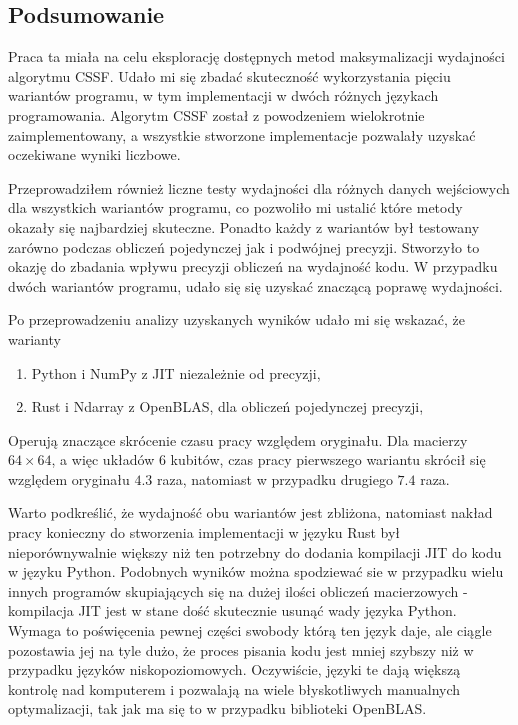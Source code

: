 \documentclass[11pt, a4paper]{article}
\begin{document}
\begin{sloppypar}
    \subsection{Podsumowanie}
    Praca ta miała na celu eksplorację dostępnych metod maksymalizacji wydajności algorytmu
    CSSF. Udało mi się zbadać skuteczność wykorzystania pięciu wariantów programu, w tym
    implementacji w dwóch różnych językach programowania. Algorytm CSSF został z
    powodzeniem wielokrotnie zaimplementowany, a wszystkie stworzone implementacje pozwalały
    uzyskać oczekiwane wyniki liczbowe.

    Przeprowadziłem również liczne testy wydajności dla różnych danych wejściowych dla wszystkich
    wariantów programu, co pozwoliło mi ustalić które metody okazały się najbardziej
    skuteczne. Ponadto każdy z wariantów był testowany zarówno podczas obliczeń pojedynczej
    jak i podwójnej precyzji. Stworzyło to okazję do zbadania wpływu precyzji obliczeń
    na wydajność kodu. W przypadku dwóch wariantów programu, udało się się uzyskać
    znaczącą poprawę wydajności.

    Po przeprowadzeniu analizy uzyskanych wyników udało mi się wskazać, że warianty
    \begin{enumerate}
      \item Python i NumPy z JIT niezależnie od precyzji,

      \item Rust i Ndarray z OpenBLAS, dla obliczeń pojedynczej precyzji,
    \end{enumerate}

    Operują znaczące skrócenie czasu pracy względem oryginału. Dla macierzy $64\times64$,
    a więc układów 6 kubitów, czas pracy pierwszego wariantu skrócił się względem oryginału
    $4.3$ raza, natomiast w przypadku drugiego $7.4$ raza.

    Warto podkreślić, że wydajność obu wariantów jest zbliżona, natomiast nakład pracy
    konieczny do stworzenia implementacji w języku Rust był nieporównywalnie większy niż
    ten potrzebny do dodania kompilacji JIT do kodu w języku Python. Podobnych wyników można
    spodziewać sie w przypadku wielu innych programów skupiających się na dużej ilości obliczeń
    macierzowych - kompilacja JIT jest w stane dość skutecznie usunąć wady języka Python.
    Wymaga to poświęcenia pewnej części swobody którą ten język daje, ale ciągle pozostawia
    jej na tyle dużo, że proces pisania kodu jest mniej szybszy niż w przypadku języków
    niskopoziomowych. Oczywiście, języki te dają większą kontrolę nad komputerem i
    pozwalają na wiele błyskotliwych manualnych optymalizacji, tak jak ma się to w przypadku
    biblioteki OpenBLAS.


\end{sloppypar}
\end{document}
